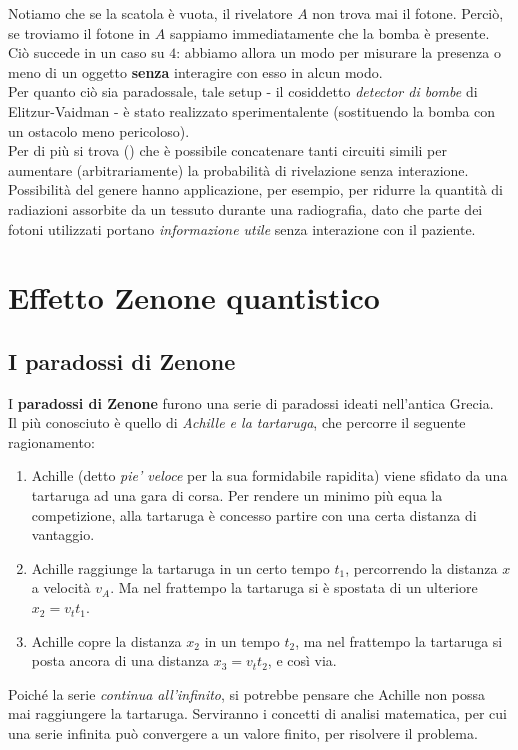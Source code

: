 \documentclass[../../InformazioneQuantistica.tex]{subfiles}
\begin{document}
Notiamo che se la scatola è vuota, il rivelatore $A$ non trova mai il fotone. Perciò, se troviamo il fotone in $A$ sappiamo immediatamente che la bomba è presente. Ciò succede in un caso su $4$: abbiamo allora un modo per misurare la presenza  o meno di un oggetto \textbf{senza} interagire con esso in alcun modo.\\
Per quanto ciò sia paradossale, tale setup - il cosiddetto \textit{detector di bombe} di Elitzur-Vaidman - è stato realizzato sperimentalente (sostituendo la bomba con un ostacolo meno pericoloso).\\
Per di più si trova (\cite{detection-free}) che è possibile concatenare tanti circuiti simili per aumentare (arbitrariamente) la probabilità di rivelazione senza interazione.\\

Possibilità del genere hanno applicazione, per esempio, per ridurre la quantità di radiazioni assorbite da un tessuto durante una radiografia, dato che parte dei fotoni utilizzati portano \textit{informazione utile} senza interazione con il paziente.

\section{Effetto Zenone quantistico}
\subsection{I paradossi di Zenone}
I \textbf{paradossi di Zenone} furono una serie di paradossi ideati nell'antica Grecia.\\
Il più conosciuto è quello di \textit{Achille e la tartaruga}, che percorre il seguente ragionamento:
\begin{enumerate}
\item Achille (detto \textit{pie' veloce} per la sua formidabile rapidita) viene sfidato da una tartaruga ad una gara di corsa. Per rendere un minimo più equa la competizione, alla tartaruga è concesso partire con una certa distanza di vantaggio.
\item Achille raggiunge la tartaruga in un certo tempo $t_1$, percorrendo la distanza $x$ a velocità $v_A$. Ma nel frattempo la tartaruga si è spostata di un ulteriore $x_2 = v_t t_1$.
\item Achille copre la distanza $x_2$ in un tempo $t_2$, ma nel frattempo la tartaruga si posta ancora di una distanza $x_3 = v_t t_2$, e così via. 
\end{enumerate}
Poiché la serie \textit{continua all'infinito}, si potrebbe pensare che Achille non possa mai raggiungere la tartaruga. Serviranno i concetti di analisi matematica, per cui una serie infinita può convergere a un valore finito, per risolvere il problema.\\
\end{document}
